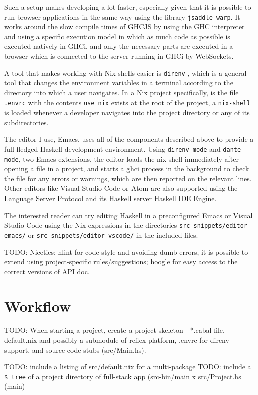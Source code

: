 \documentclass[english,odsaz]{fitthesis}
\begin{document}
Such a setup makes developing a lot faster, especially given that it is possible
to run browser applications in the same way using the library \texttt{jsaddle-warp}. It
works around the slow compile times of GHCJS by using the GHC interpreter and
using a specific execution model in which as much code as possible is executed
natively in GHCi, and only the necessary parts are executed in a browser which
is connected to the server running in GHCi by WebSockets.

A tool that makes working with Nix shells easier is \texttt{direnv} \cite{direnv}, which is
a general tool that changes the environment variables in a terminal according to
the directory into which a user navigates. In a Nix project specifically, is the
file \texttt{.envrc} with the contents \texttt{use nix} exists at the root of the project, a
\texttt{nix-shell} is loaded whenever a developer navigates into the project directory or
any of its subdirectories.

The editor I use, Emacs, uses all of the components described above to provide a
full-fledged Haskell development environment. Using \texttt{direnv-mode} and \texttt{dante-mode},
two Emacs extensions, the editor loads the nix-shell immediately after opening a
file in a project, and starts a ghci process in the background to check the file
for any errors or warnings, which are then reported on the relevant lines.
Other editors like Visual Studio Code or Atom are also supported using the
Language Server Protocol and its Haskell server Haskell IDE Engine.

The interested reader can try editing Haskell in a preconfigured Emacs or Visual
Studio Code using the Nix expressions in the directories
\texttt{src-snippets/editor-emacs/} or \texttt{src-snippets/editor-vscode/} in the included files.

TODO: Niceties: hlint for code style and avoiding dumb errors, it is possible to
extend using project-specific rules/suggestions; hoogle for easy access
to the correct versions of API doc.

\section{Workflow}
\label{sec:org362393f}
TODO: When starting a project, create a project skeleton - *.cabal file,
default.nix and possibly a submodule of reflex-platform, .envrc for direnv
support, and source code stubs (src/Main.hs).

TODO: include a listing of src/default.nix for a multi-package
TODO: include a \texttt{\$ tree} of a project directory of full-stack app (src-bin/main x
src/Project.hs (main)
\end{document}
